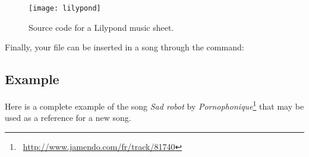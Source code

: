 \begin{figure}
  \begin{minipage}[b]{\linewidth}
    \centering
    \texttt{[image: lilypond]}
    \vspace{0.5cm}
  \end{minipage}

  \begin{minipage}[b]{\linewidth}
  \end{minipage}
  \caption{Source code for a Lilypond music sheet.}
  \label{fig:lilypond}
\end{figure}

Finally, your file  can be inserted in a song  through
the  command:

\begin{songbook}
\end{songbook}

\subsection{Example}

Here is a complete example of the song \emph{Sad robot} by
\emph{Pornophonique}\footnote{\byncnd~\url{http://www.jamendo.com/fr/track/81740}}
that may be used as a reference for a new song.

